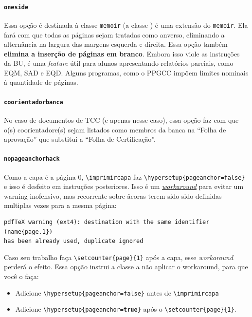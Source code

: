 \documentclass[embeddedlogo]{ufsc-thesis-rn46-2019}
\newcommand{\lacmd}[1]{\texttt{\textbackslash{}#1}}
\begin{document}
\paragraph*{\texttt{oneside}} Essa opção é destinada à classe \texttt{memoir} (a
classe \abnTeX) é uma extensão do \texttt{memoir}. Ela fará com que todas as
páginas sejam tratadas como anverso, eliminando a alternância na largura das
margens esquerda e direita. Essa opção também \textbf{elimina a inserção de
  páginas em branco}. Embora isso viole as instruções da BU, é uma \emph{feature} útil
para alunos apresentando relatórios parciais, como EQM, SAD e EQD. Alguns
programas, como o PPGCC impõem limites nominais à quantidade de páginas.

\paragraph*{\texttt{coorientadorbanca}}
No caso de documentos de TCC (e apenas nesse caso), essa opção faz com que o(s)
coorientadore(s) sejam listados como membros da banca na ``Folha de aprovação''
que substitui a ``Folha de Certificação''. 

\paragraph*{\texttt{nopageanchorhack}}
Como a capa é a página 0, \lacmd{imprimircapa} faz
\lacmd{hypersetup\{pageanchor=false\}} e isso é desfeito em instruções
posteriores. Isso é um
\href{https://tex.stackexchange.com/a/331766}{\emph{workaround}} para evitar um
warning inofensivo, mas recorrente sobre âcoras terem sido sido definidas
multiplas vezes para a mesma página:
\begin{verbatim}
pdfTeX warning (ext4): destination with the same identifier (name{page.1})
has been already used, duplicate ignored
\end{verbatim}
Caso seu trabalho faça \lacmd{setcounter\{page\}\{1\}} após a capa, esse
\emph{workaround} perderá o efeito. Essa opção instrui a classe a não aplicar o
workaround, para que você o faça:
\begin{itemize}
\item Adicione \lacmd{hypersetup\{pageanchor=false\}} antes de \lacmd{imprimircapa}
\item Adicione \lacmd{hypersetup\{pageanchor=\textbf{true}\}} após o
      \lacmd{setcounter\{page\}\{1\}}.
\end{itemize}
\end{document}
